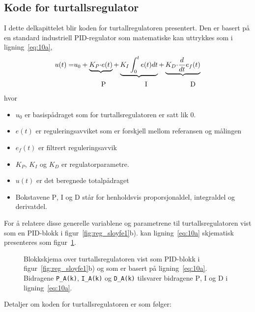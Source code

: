 \subsection{Kode for turtallsregulator}
I dette delkapittelet blir koden for turtallregulatoren
presentert. Den er basert på en standard industriell PID-regulator som 
matematiske kan uttrykkes som i
ligning~\eqref{eq:10a},
\begin{align}
 u(t) =&  u_{0} + \underbrace{K_P{\cdot} e(t)} + 
             \underbrace{K_{I}\int_0^t e(t)dt} + 
             \underbrace{K_D {\cdot}\frac{d}{dt} e_{f}(t)}   \label{eq:10a}\\
 & \hspace*{14mm} \mathrm{P} \hspace*{20mm} \mathrm{I} 
\hspace*{22mm} \mathrm{D} \notag
\end{align}
hvor 
\begin{itemize}
\setlength\itemsep{0mm}
\item $u_{0}$ er basispådraget som for turtallsregulatoren
  er satt lik 0.
\item $e(t)$ er reguleringsavviket som er forskjell mellom referansen
  og målingen
\item $e_{f}(t)$ er filtrert reguleringsavvik
\item $K_{P}$, $K_{I}$ og $K_{D}$ er regulatorparametre.  
\item $u(t)$ er det beregnede totalpådraget 
\item Bokstavene $\mathrm{P}$, $\mathrm{I}$ og  
 $\mathrm{D}$ står for henholdsvis proporsjonaldel, integraldel og
  derivat\-del. 
\end{itemize}

For å relatere disse generelle variablene og parametrene 
til turtallsregulatoren vist
som en PID-blokk i  figur~\ref{fig:reg_sloyfe1}b). 
kan ligning~\eqref{eq:10a} skjematisk presenteres som
figur~\ref{fig:pid_blokk}.
\begin{figure}[H]
  \centering
  \hspace*{0mm}
  \caption{Blokkskjema over turtallsregulatoren vist som PID-blokk i
    figur~\ref{fig:reg_sloyfe1}b) og som er basert på
    ligning~\eqref{eq:10a}. Bidragene {\tt P\_A(k)},  {\tt I\_A(k)} og  
    {\tt D\_A(k)}  tilsvarer bidragene $\mathrm{P}$, $\mathrm{I}$ og  
    $\mathrm{D}$ i ligning~\eqref{eq:10a}.} 
  \label{fig:pid_blokk}
\end{figure}
Detaljer om koden for turtallsregulatoren er som følger:

